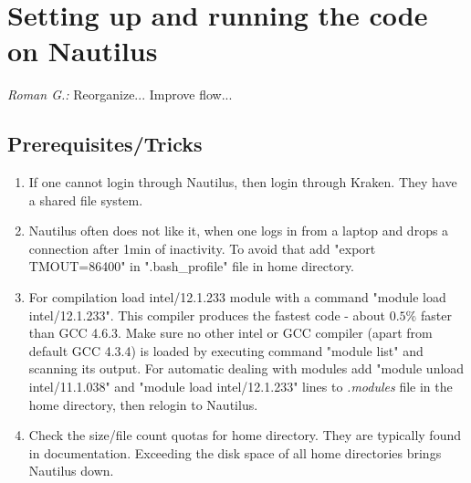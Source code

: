 \documentclass{emulateapj}
\newcommand{\rg}[1]{\color{blue}\textit{Roman G.:} #1\color{black}}
\begin{document}
\section{Setting up and running the code on Nautilus}
\rg{Reorganize... Improve flow...}
\subsection{Prerequisites/Tricks}
\begin{enumerate}
\item{If one cannot login through Nautilus, then login through
  Kraken. They have a shared file system.}
\item{Nautilus often does not like it, when one logs in from a laptop
  and drops a connection after 1min of inactivity.  To avoid that add
  "export TMOUT=86400" in ".bash\_profile" file in home directory.}
\item{For compilation load intel/12.1.233 module with a command
  "module load intel/12.1.233". This compiler produces the fastest
  code - about $0.5\%$ faster than GCC 4.6.3.  Make sure no other
  intel or GCC compiler (apart from default GCC 4.3.4) is loaded by
  executing command "module list" and scanning its output.  For
  automatic dealing with modules add "module unload intel/11.1.038"
  and "module load intel/12.1.233" lines to \textit{.modules} file in
  the home directory, then relogin to Nautilus.}
\item{Check the size/file count quotas for home directory. They are
  typically found in documentation. Exceeding the disk space of all
  home directories brings Nautilus down.}
\end{enumerate}
\end{document}
